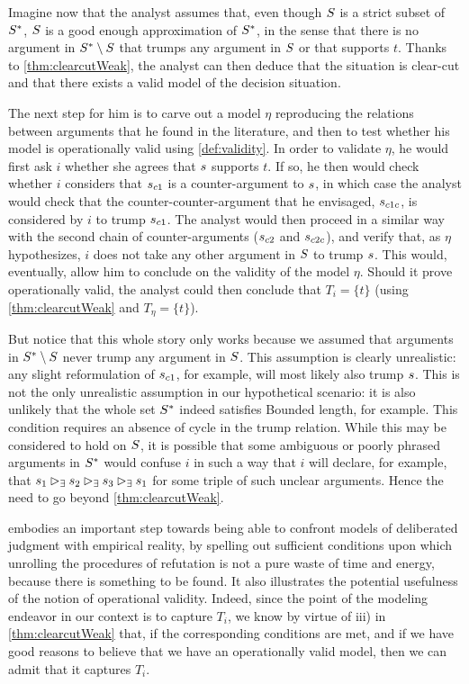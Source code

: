 \documentclass[version=3.21, pagesize, twoside=off, bibliography=totoc, DIV=calc, fontsize=12pt, a4paper]{scrartcl}
\begin{document}
\begin{example}
Imagine now that the analyst assumes that, even though $S$ is a strict subset of $S^*$, $S$ is a good enough approximation of $S^*$, in the sense that there is no argument in $S^* \setminus S$ that trumps any argument in $S$ or that supports $t$.
Thanks to \cref{thm:clearcutWeak}, the analyst can then deduce that the situation is clear-cut and that there exists a valid model of the decision situation.

The next step for him is to carve out a model $\eta$ reproducing the relations between arguments that he found in the literature, and then to test whether his model is operationally valid using \cref{def:validity}. 
In order to validate $\eta$, he would first ask $i$ whether she agrees that $s$ supports $t$. If so, he then would check whether $i$ considers that $s_{c1}$ is a counter-argument to $s$, in which case the analyst would check that the counter-counter-argument that he envisaged, $s_{c1c}$, is considered by $i$ to trump $s_{c1}$. The analyst would then proceed in a similar way with the second chain of counter-arguments ($s_{c2}$ and $s_{c2c}$), and verify that, as $\eta$ hypothesizes, $i$ does not take any other argument in $S$ to trump $s$. This would, eventually, allow him to conclude on the validity of the model $\eta$.
Should it prove operationally valid, the analyst could then conclude that $T_i=\{t\}$ (using \cref{thm:clearcutWeak} and $T_\eta=\{t\}$). 

But notice that this whole story only works because we assumed that arguments in $S^* \setminus S$ never trump any argument in $S$. This assumption is clearly unrealistic: any slight reformulation of $s_{c1}$, for example, will most likely also trump $s$. This is not the only unrealistic assumption in our hypothetical scenario: it is also unlikely that the whole set $S^*$ indeed satisfies Bounded length, for example. This condition requires an absence of cycle in the trump relation. While this may be considered to hold on $S$, it is possible that some ambiguous or poorly phrased arguments in $S^*$ would confuse $i$ in such a way that $i$ will declare, for example, that $s_1 \mathbin{\vartriangleright_\exists} s_2 \mathbin{\vartriangleright_\exists} s_3 \mathbin{\vartriangleright_\exists} s_1$ for some triple of such unclear arguments. Hence the need to go beyond \cref{thm:clearcutWeak}.
\end{example}

 embodies an important step towards being able to confront models of deliberated judgment with empirical reality, by spelling out sufficient conditions upon which unrolling the procedures of refutation is not a pure waste of time and energy, because there is something to be found. It also illustrates the potential usefulness of the notion of operational validity. Indeed, since the point of the modeling endeavor in our context is to capture $T_i$, we know by virtue of iii) in \cref{thm:clearcutWeak} that, if the corresponding conditions are met, and if we have good reasons to believe that we have an operationally valid model, then we can admit that it captures $T_i$.
\end{document}
